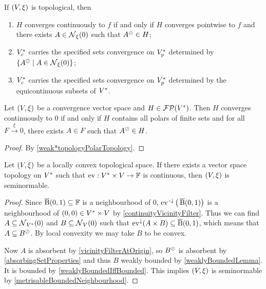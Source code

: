 \begin{corollary} \label{continuousDualTopologicalSpace}
If $\sSet{V, \xi}$ is topological, then
\begin{enumerate}
\item $H$ converges continuously to $f$ \textup{if and only if} $H$ converges pointwise to $f$ and there exists $A\in \operatorname{\mathcal{N}}_\xi(0)$ such that $A^\oslash\in H$;
\item ${V}^*_c$ carries the specified sets convergence on ${V}^*_p$ determined by $\setbuilder{A^\pol}{A\in \neighbourhood_\xi(0)}$;
\item ${V}^*_c$ carries the specified sets convergence on ${V}^*_p$ determined by the equicontinuous subsets of ${V}^*$.
\end{enumerate}
\end{corollary}
\begin{corollary}
Let $\sSet{V,\xi}$ be a convergence vector space and $H\in \operatorname{\mathcal{FP}}({V}^*)$. Then $H$ converges continuously to $0$ \textup{if and only if} $H$ contains all polars of finite sets and for all $F \overset{\xi}{\longrightarrow} 0$, there exists $A\in F$ such that $A^\oslash\in H$.
\end{corollary}
\begin{proof}
By \ref{weak*topologyPolarTopology}.
\end{proof}

\begin{proposition}
Let $\sSet{V,\xi}$ be a locally convex topological space. If there exists a vector space topology on ${V}^*$ such that $\operatorname{ev}: {V}^*\times V\to \mathbb{F}$ is continuous, then $\sSet{V,\xi}$ is seminormable.
\end{proposition}
\begin{proof}
Since $\operatorname{\overline{B}}(0,1)\subseteq \mathbb{F}$ is a neighbourhood of $0$, $\operatorname{ev}^{{\text{\hspace{0.15em}-}\downarrow}}\big(\operatorname{\overline{B}}(0,1)\big)$ is a neighbourhood of $(0,0)\in {V}^*\times V$ by \ref{continuityVicinityFilter}. Thus we can find $A\subseteq \operatorname{\mathcal{N}}_{{V}^*}(0)$ and $B\subseteq \operatorname{\mathcal{N}}_V(0)$ such that $\operatorname{ev}^\downarrow(A\times B)\subseteq \operatorname{\overline{B}}(0,1)$, which means that $A\subseteq B^\oslash$. By local convexity we may take $B$ to be convex.

Now $A$ is absorbent by \ref{vicinityFilterAtOrigin}, so $B^\oslash$ is absorbent by \ref{absorbingSetProperties} and thus $B$ weakly bounded by \ref{weaklyBoundedLemma}. It is bounded by \ref{weaklyBoundedIffBounded}. This implies $\sSet{V,\xi}$ is seminormable by \ref{metrisableBoundedNeighbourhood}.
\end{proof}


